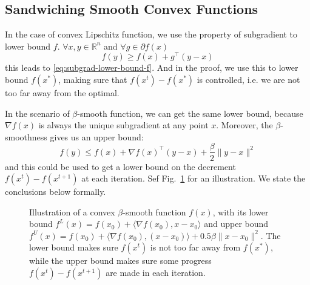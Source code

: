 \documentclass{scrartcl}
\newcommand{\RR}{\mathbb{R}}
\begin{document}
\subsection{Sandwiching Smooth Convex Functions}

In the case of convex Lipschitz function, we use the property of subgradient to lower bound $f$.
$\forall x,y\in\RR^n$ and $\forall g\in\partial f(x)$
\[
  f(y) \geq f(x) + g^\top (y-x)
\]
this leads to \eqref{eq:subgrad-lower-bound-f}. And in the proof, we use this to lower bound $f
(x^*)$, making sure that $f(x^t)-f(x^*)$ is controlled, i.e. we are not too far away from the
optimal.

In the scenario of $\beta$-smooth function, we can get the same lower bound, because $\nabla f(x)$
is always the unique subgradient at any point $x$. Moreover, the $\beta$-smoothness gives us an
upper bound:
\[
  f(y) \leq f(x) + \nabla f(x)^\top (y-x) + \frac{\beta}{2}\|y-x\|^2
\]
and this could be used to get a lower bound on the decrement $f(x^t)-f(x^{t+1})$ at each iteration.
Sef Fig.~\ref{fig:lower-and-upper-bnd-smooth-cvx} for an illustration. We state the conclusions
below formally.

\begin{figure}
  \caption{Illustration of a convex $\beta$-smooth function $f(x)$, with its lower bound $f^L(x)=f
  (x_0)+\langle \nabla f(x_0),x-x_0\rangle$ and upper bound $f^U(x)=f(x_0)+\langle \nabla f(x_0),
  (x-x_0)\rangle + 0.5\beta\|x-x_0\|^2$. The lower bound makes sure $f (x^t)$ is not too far away
  from $f (x^*)$, while
  the upper bound makes sure some progress $f(x^t)-f(x^{t+1})$ are made in each iteration.}
  \label{fig:lower-and-upper-bnd-smooth-cvx}
\end{figure}
\end{document}
